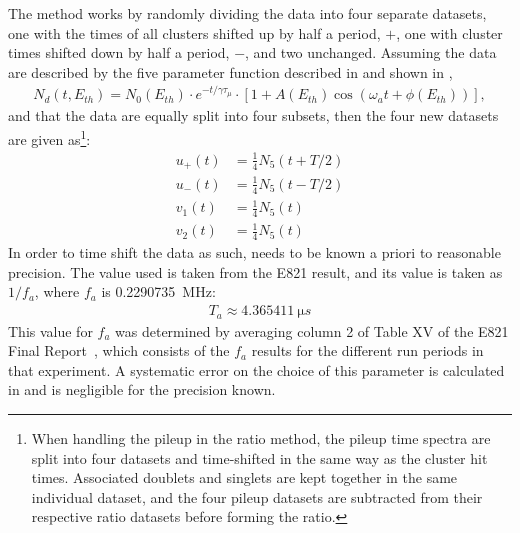 The method works by randomly dividing the data into four separate datasets, one with the times of all clusters shifted up by half a \gmtwo period, $+$\Tatwo, one with cluster times shifted down by half a \gmtwo period, $-$\Tatwo, and two unchanged. Assuming the data are described by the five parameter function described in  and shown in , %
        \begin{align} \label{eq:5parfuncrepeated}
            N_{d}(t, E_{th}) = N_{0}(E_{th}) \cdot e^{-t/\gamma\tau_{\mu}} \cdot [1 + A(E_{th}) \cos(\omega_{a}t+\phi(E_{th}))],
        \end{align}
and that the data are equally split into four subsets, then the four new datasets are given as\footnote{When handling the pileup in the ratio method, the pileup time spectra are split into four datasets and time-shifted in the same way as the cluster hit times. Associated doublets and singlets are kept together in the same individual dataset, and the four pileup datasets are subtracted from their respective ratio datasets before forming the ratio.}:
    \begin{equation}
    \begin{aligned}
        u_{+}(t) &= \frac{1}{4} N_{5}(t+T/2) \\
        u_{-}(t) &= \frac{1}{4} N_{5}(t-T/2) \\
        v_{1}(t) &= \frac{1}{4} N_{5}(t) \\
        v_{2}(t) &= \frac{1}{4} N_{5}(t)
    \end{aligned}
    \end{equation}
In order to time shift the data as such, \Ta needs to be known a priori to reasonable precision. The value used is taken from the E821 result, and its value is taken as $1/f_{a}$, where $f_{a}$ is \SI{0.2290735}{MHz}:
        \begin{align}
            T_{a} \approx \SI{4.365411}{\micro s}
        \label{eq:Ta}
        \end{align}
This value for $f_{a}$ was determined by averaging column 2 of Table XV of the E821 Final Report~\cite{E821FinalReport}, which consists of the $f_{a}$ results for the different run periods in that experiment. A systematic error on the choice of this parameter is calculated in  and is negligible for the precision known.

